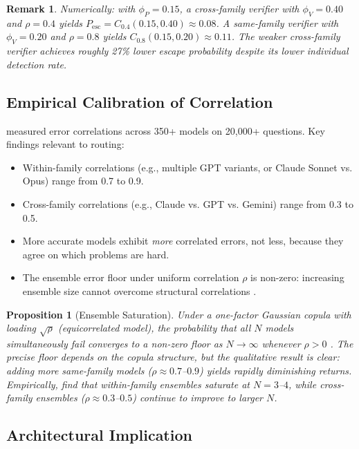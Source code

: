 \documentclass[11pt, a4paper, copyright]{googledeepmind}
\newtheorem{proposition}{Proposition}[section]
\newtheorem*{remark}{Remark}
\begin{document}
\begin{remark}
Numerically: with $\phi_P = 0.15$, a cross-family verifier with $\phi_V = 0.40$ and $\rho = 0.4$ yields $P_{\mathrm{esc}} = C_{0.4}(0.15, 0.40) \approx 0.08$. A same-family verifier with $\phi_V = 0.20$ and $\rho = 0.8$ yields $C_{0.8}(0.15, 0.20) \approx 0.11$. The weaker cross-family verifier achieves roughly 27\% lower escape probability despite its lower individual detection rate.
\end{remark}

\subsection{Empirical Calibration of Correlation}

\citet{correlatedllm2025} measured error correlations across 350+ models on 20,000+ questions. Key findings relevant to routing:

\begin{itemize}
\item Within-family correlations (e.g., multiple GPT variants, or Claude Sonnet vs. Opus) range from 0.7 to 0.9.
\item Cross-family correlations (e.g., Claude vs. GPT vs. Gemini) range from 0.3 to 0.5.
\item More accurate models exhibit \emph{more} correlated errors, not less, because they agree on which problems are hard.
\item The ensemble error floor under uniform correlation $\rho$ is non-zero: increasing ensemble size cannot overcome structural correlations \citep{correlatedensemble2026}.
\end{itemize}

\begin{proposition}[Ensemble Saturation]
\label{prop:saturation}
Under a one-factor Gaussian copula with loading $\sqrt{\rho}$ (equicorrelated model), the probability that all $N$ models simultaneously fail converges to a non-zero floor as $N \to \infty$ whenever $\rho > 0$ \citep{correlatedensemble2026}. The precise floor depends on the copula structure, but the qualitative result is clear: adding more same-family models ($\rho \approx 0.7$--$0.9$) yields rapidly diminishing returns. Empirically, \citet{correlatedensemble2026} find that within-family ensembles saturate at $N = 3$--$4$, while cross-family ensembles ($\rho \approx 0.3$--$0.5$) continue to improve to larger $N$.
\end{proposition}

\subsection{Architectural Implication}
\end{document}
